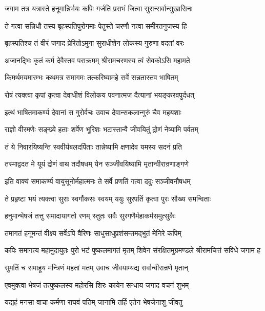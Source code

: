 \twolineshloka
{जगाम तत्र यत्रास्ते हनूमान्निर्भयः कपिः}
{गर्जति प्रसभं जित्वा सुरान्सर्वान्सुखासिनः}%

\twolineshloka
{ते गत्वा सन्निधौ तस्य बृहस्पतिपुरोगमाः}
{पेतुस्ते चरणौ नत्वा समीरतनुजस्य हि}%

\twolineshloka
{बृहस्पतिश्च तं वीरं जगाद प्रेरितोऽमुना}
{सुराधीशेन लोकस्य गुरुणा वदतां वरः}%

\twolineshloka
{अजानद्भिः कृतं कर्म देवैस्तव पराक्रमम्}
{श्रीरामचरणस्य त्वं सेवकोऽसि महामते}%

\twolineshloka
{किमर्थमयमारम्भः कथमत्र समागमः}
{तत्करिष्यामहे सर्वे सन्नतास्तव भाषितम्}%

\twolineshloka
{रोषं त्यक्त्वा कृपां कृत्वा देवाधीशं विलोकय}
{पवनात्मज दैत्यानां भयङ्करवपुर्दधत्}%


\twolineshloka
{इत्थं भाषितमाकर्ण्य देवानां स गुरोर्वचः}
{उवाच देवान्सकलान्गुरुं चैव महयशाः}%

\twolineshloka
{राज्ञो वीरमणेः सङ्ख्ये हताः शर्वेण भूरिशः}
{भटास्तान्वै जीवयितुं द्रोणं नेष्यामि पर्वतम्}%

\twolineshloka
{तं ये निवारयिष्यन्ति स्ववीर्यबलदर्पिताः}
{तान्नेष्यामि क्षणादेव यमस्य सदनं प्रति}%

\twolineshloka
{तस्माद्वदत मे यूयं द्रोणं वाथ तदौषधम्}
{येन सञ्जीवयिष्यामि मृतान्वीरान्रणाङ्गणे}%


\twolineshloka
{इति वाक्यं समाकर्ण्य वायुसूनोर्महात्मनः}
{ते सर्वे प्रणतिं गत्वा ददुः सञ्जीवनौषधम्}%

\twolineshloka
{ते प्रहृष्टा भयं त्यक्त्वा सुराः स्वर्गौकसः स्वयम्}
{ययुः सुरपतिं कृत्वा पुरः सौख्य समन्विताः}%

\twolineshloka
{हनुमान्भेषजं तत्तु समादायागतो रणम्}
{स्तुतः सर्वैः सुरगणैर्महाकर्मसमुत्सुकैः}%

\twolineshloka
{तमागतं हनूमन्तं वीक्ष्य सर्वेऽपि वैरिणः}
{साधुसाधुप्रशंसन्तमद्भुतं मेनिरे कपिम्}%

\fourlineindentedshloka
{कपिः समागत्य महामुदायुतः}
{पुरो भटं पुष्कलमागतं मृतम्}
{शिवेन संरक्षितमुग्रमण्डले}
{श्रीरामचित्तं सविधे जगाम ह}%

\twolineshloka
{सुमतिं च समाहूय मन्त्रिणं महतां मतम्}
{उवाच जीवयाम्यद्य सर्वान्वीरान्रणे मृतान्}%

\twolineshloka
{एवमुक्त्वा भेषजं तत्पुष्कलस्य महोरसि}
{शिरः कायेन सन्धाय जगाद वचनं शुभम्}%

\twolineshloka
{यद्यहं मनसा वाचा कर्मणा राघवं पतिम्}
{जानामि तर्हि एतेन भेषजेनाशु जीवतु}%

